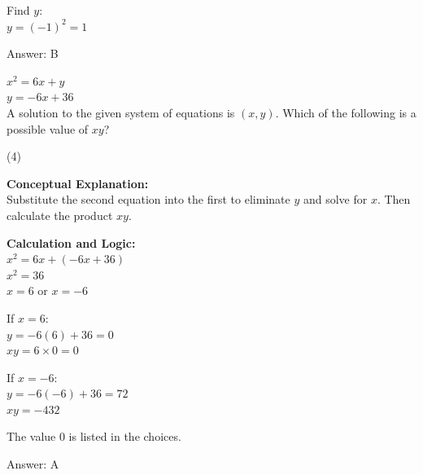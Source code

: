 \documentclass[11pt,paper=a4,answers]{exam}
\begin{document}
\begin{questions}
\begin{solution}
Find $y$: \\
$y = (-1)^2 = 1$

\vspace{25pt}

Answer: \colorbox{yellow!100}{B}
\end{solution}

\vspace{40pt}

\question
$x^2 = 6x + y$ \\
$y = -6x + 36$ \\
A solution to the given system of equations is $(x, y)$. Which of the following is a possible value of $xy$?
\begin{tasks}(4)
\end{tasks}

\begin{solution}
\textbf{Conceptual Explanation:} \\
Substitute the second equation into the first to eliminate $y$ and solve for $x$. Then calculate the product $xy$.

\vspace{20pt}

\textbf{Calculation and Logic:} \\
$x^2 = 6x + (-6x + 36)$ \\
$x^2 = 36$ \\
$x = 6$ or $x = -6$

\vspace{10pt}

If $x = 6$: \\
$y = -6(6) + 36 = 0$ \\
$xy = 6 \times 0 = 0$

\vspace{10pt}

If $x = -6$: \\
$y = -6(-6) + 36 = 72$ \\
$xy = -432$

\vspace{10pt}

The value 0 is listed in the choices.

\vspace{25pt}

Answer: \colorbox{yellow!100}{A}
\end{solution}

\vspace{40pt}


\end{questions}
\end{document}
